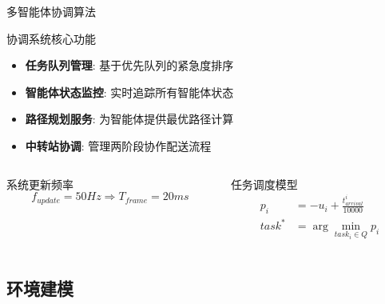 \documentclass[
10pt,
aspectratio=169,
]{beamer}
\begin{document}
\begin{frame}{多智能体协调算法}
    \begin{block}{协调系统核心功能}
        \begin{itemize}
            \item \textbf{任务队列管理}: 基于优先队列的紧急度排序
            \item \textbf{智能体状态监控}: 实时追踪所有智能体状态
            \item \textbf{路径规划服务}: 为智能体提供最优路径计算
            \item \textbf{中转站协调}: 管理两阶段协作配送流程
        \end{itemize}
    \end{block}
    
    \begin{columns}
        \begin{column}{0.5\textwidth}
            \begin{alertblock}{系统更新频率}
                \begin{equation}
                f_{update} = 50 Hz \Rightarrow T_{frame} = 20 ms
                \end{equation}
            \end{alertblock}
        \end{column}
        \begin{column}{0.5\textwidth}
            \begin{exampleblock}{任务调度模型}
                \begin{align}
                p_i &= -u_i + \frac{t_{arrival}^i}{10000} \\
                task^* &= \arg\min_{task_i \in Q} p_i
                \end{align}
            \end{exampleblock}
        \end{column}
    \end{columns}
\end{frame}


\subsection{环境建模}
\end{document}
